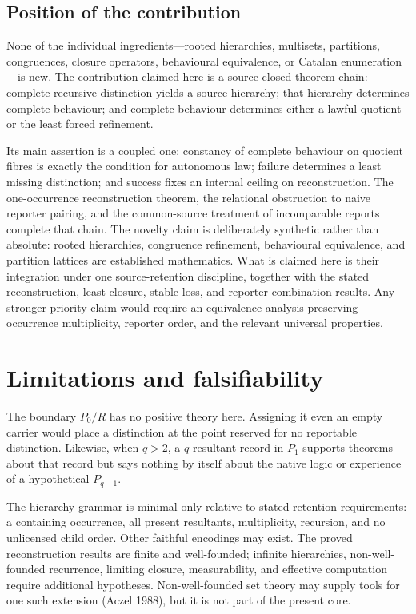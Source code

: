 \documentclass[11pt,a4paper]{article}
\begin{document}
\subsection{Position of the
contribution}

None of the individual ingredients---rooted hierarchies, multisets,
partitions, congruences, closure operators, behavioural equivalence, or
Catalan enumeration---is new. The contribution claimed here is a
source-closed theorem chain: complete recursive distinction yields a
source hierarchy; that hierarchy determines complete behaviour; and
complete behaviour determines either a lawful quotient or the least
forced refinement.

Its main assertion is a coupled one: constancy of complete behaviour on
quotient fibres is exactly the condition for autonomous law; failure
determines a least missing distinction; and success fixes an internal
ceiling on reconstruction. The one-occurrence reconstruction theorem,
the relational obstruction to naive reporter pairing, and the
common-source treatment of incomparable reports complete that chain. The
novelty claim is deliberately synthetic rather than absolute: rooted
hierarchies, congruence refinement, behavioural equivalence, and
partition lattices are established mathematics. What is claimed here is
their integration under one source-retention discipline, together with
the stated reconstruction, least-closure, stable-loss, and
reporter-combination results. Any stronger priority claim would require
an equivalence analysis preserving occurrence multiplicity, reporter
order, and the relevant universal properties.

\section{Limitations and
falsifiability}

The boundary \(P_{0}/R\) has no positive theory here. Assigning it even
an empty carrier would place a distinction at the point reserved for no
reportable distinction. Likewise, when \(q > 2\), a \(q\)-resultant
record in \(P_{1}\) supports theorems about that record but says nothing
by itself about the native logic or experience of a hypothetical
\(P_{q - 1}\).

The hierarchy grammar is minimal only relative to stated retention
requirements: a containing occurrence, all present resultants,
multiplicity, recursion, and no unlicensed child order. Other faithful
encodings may exist. The proved reconstruction results are finite and
well-founded; infinite hierarchies, non-well-founded recurrence,
limiting closure, measurability, and effective computation require
additional hypotheses. Non-well-founded set theory may supply tools for
one such extension (Aczel 1988), but it is not part of the present core.
\end{document}
